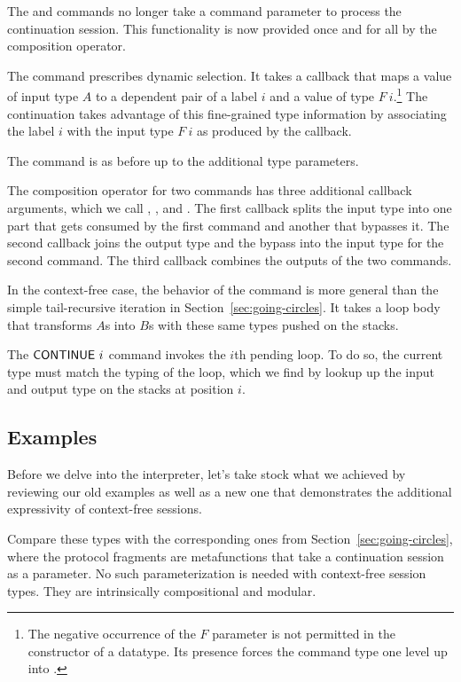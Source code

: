 \documentclass[acmsmall,screen,anonymous,review]{acmart}
\begin{document}
The {\ACSEND} and {\ACRECV} commands no longer take a command parameter
to process the continuation session. This functionality is now
provided once and for all by the composition operator.

The command {\ACSELECT} prescribes dynamic selection. It takes a
callback that maps a value of input type $A$ to a dependent pair of a
label $i$ and a value of type $F~i$.\footnote{The negative occurrence
  of the $F$ parameter is not permitted in the constructor of a
  {\ASet} datatype. Its presence forces the command type one level up
  into {\ASetOne}.} The continuation takes advantage of this
fine-grained type information by associating the label $i$ with the
input type $F~i$ as produced by the callback.

The {\ACCHOICE} command is as before up to the additional type parameters.

The composition operator for two commands has three additional
callback arguments, which we call {\Asplit}, {\Across}, and
{\Ajoin}. The first callback {\Asplit} splits the input type into one part that gets
consumed by the first command and another that bypasses it.
The second callback {\Across} joins the output type and the bypass into the
input type for the second command.
The third callback {\Ajoin} combines the outputs of the two commands.

In the context-free case, the behavior of the {\AMU} command is more
general than the simple tail-recursive iteration in
Section~\ref{sec:going-circles}. It takes a loop body that transforms
$A$s into $B$s with these same types pushed on the stacks.

The {$\ACONTINUE~i$} command invokes the $i$th pending loop. To do so,
the current type must match the typing of the loop, which we find by
lookup up the input and output type on the stacks at position $i$.

\subsection{Examples}
\label{sec:examples}



Before we delve into the interpreter, let's take stock what we
achieved by reviewing our old examples as well as a new one that
demonstrates the additional expressivity of context-free sessions.
\cstBinaryp

Compare these types with the corresponding ones from
Section~\ref{sec:going-circles}, where the protocol fragments are
metafunctions that take a continuation session as a parameter. No such
parameterization is needed with context-free session types. They are
intrinsically compositional and modular.
\end{document}

